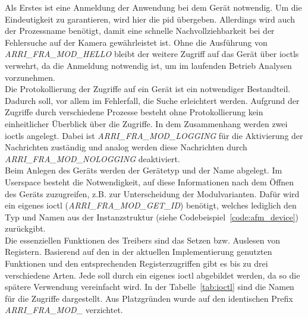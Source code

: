 Als Erstes ist eine Anmeldung der Anwendung bei dem Gerät notwendig. Um die Eindeutigkeit zu garantieren, wird hier die \ac{pid} übergeben. Allerdings wird auch der Prozessname benötigt, damit eine schnelle Nachvollziehbarkeit bei der Fehlersuche auf der Kamera gewährleistet ist.
Ohne die Ausführung von \mbox{\textit{ARRI\_FRA\_MOD\_HELLO}} bleibt der weitere Zugriff auf das Gerät über \ac{ioctl}s verwehrt, da die Anmeldung notwendig ist, um im laufenden Betrieb Analysen vorzunehmen.\\

Die Protokollierung der Zugriffe auf ein Gerät ist ein notwendiger Bestandteil. Dadurch soll, vor allem im Fehlerfall, die Suche erleichtert werden. Aufgrund der Zugriffe durch verschiedene Prozesse besteht ohne Protokollierung kein einheitlicher Überblick über die Zugriffe.
In dem Zusammenhang werden zwei \ac{ioctl}s angelegt. Dabei ist \mbox{\textit{ARRI\_FRA\_MOD\_LOGGING}} für die Aktivierung der Nachrichten zuständig und analog werden diese Nachrichten durch \mbox{\textit{ARRI\_FRA\_MOD\_NOLOGGING}} deaktiviert. \\

Beim Anlegen des Geräts werden der Gerätetyp und der Name abgelegt. Im Userspace besteht die Notwendigkeit, auf diese Informationen nach dem Öffnen des Geräts zuzugreifen, z.B. zur Unterscheidung der Modulvarianten. Dafür wird ein eigenes \ac{ioctl} (\mbox{\textit{ARRI\_FRA\_MOD\_GET\_ID}}) benötigt, welches lediglich den Typ und Namen aus der Instanzstruktur (siehe Codebeispiel~\ref{code:afm_device}) zurückgibt.\\

Die essenziellen Funktionen des Treibers sind das Setzen bzw. Auslesen von Registern. Basierend auf den in der aktuellen Implementierung genutzten Funktionen und den entsprechenden Registerzugriffen gibt es bis zu drei verschiedene Arten. Jede soll durch ein eigenes \ac{ioctl} abgebildet werden, da so die spätere Verwendung vereinfacht wird.  In der Tabelle~\ref{tab:ioctl} sind die Namen für die Zugriffe dargestellt. Aus Platzgründen wurde auf den identischen Prefix \mbox{\textit{ARRI\_FRA\_MOD\_}} verzichtet.



